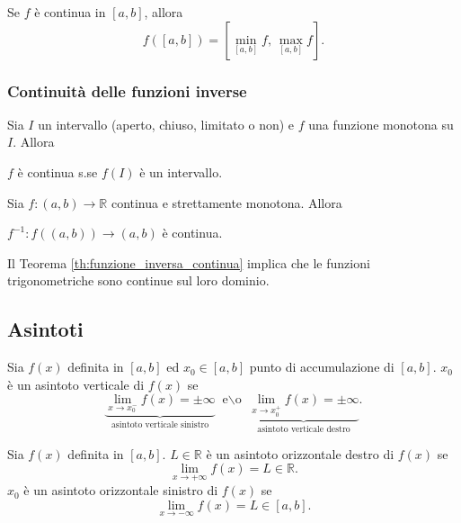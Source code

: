 \begin{theorem}
    Se $f$ è continua in $[a,b]$, allora
    \begin{equation*}
        f([a,b])=\left[\underset{[a,b]}{\min}f,\, \underset{[a,b]}{\max}f\right].
    \end{equation*}
\end{theorem}

\subsubsection{Continuità delle funzioni inverse}

\begin{proposition}
    Sia $I$ un intervallo (aperto, chiuso, limitato o non) e $f$ una funzione monotona su $I$. Allora
    \begin{center}
        $f$ è continua s.se $f(I)$ è un intervallo.
    \end{center}
\end{proposition}

\begin{theorem}\label{th:funzione_inversa_continua}
    Sia $f\colon (a,b)\rightarrow\mathbb R$ continua e strettamente monotona. Allora
    \begin{center}
        $f^{-1}:f((a,b))\rightarrow(a,b)$ è continua.
    \end{center}
\end{theorem}

Il Teorema \ref{th:funzione_inversa_continua} implica che le funzioni trigonometriche sono continue sul loro dominio.

\subsection{Asintoti}
\begin{definition}
    Sia $f(x)$ definita in $[a,b]$ ed $x_0\in[a,b]$ punto di accumulazione di $[a,b]$. $x_0$ è un asintoto verticale di $f(x)$ se
    \begin{equation*}
        \underbrace{\lim_{x\rightarrow x_0^-}f(x)=\pm\infty}_{\text{asintoto verticale sinistro}}\text{ e$\backslash$o } \underbrace{\lim_{x\rightarrow x_0^+}f(x)=\pm\infty}_{\text{asintoto verticale destro}}.
    \end{equation*}
\end{definition}

\begin{definition}
    Sia $f(x)$ definita in $[a,b]$. $L\in\mathbb R$ è un asintoto orizzontale destro di $f(x)$ se
    \begin{equation*}
        \lim_{x\rightarrow+\infty}f(x)=L\in\mathbb R.
    \end{equation*}
    $x_0$ è un asintoto orizzontale sinistro di $f(x)$ se
    \begin{equation*}
        \lim_{x\rightarrow-\infty}f(x)=L\in[a,b].
    \end{equation*}
\end{definition}


